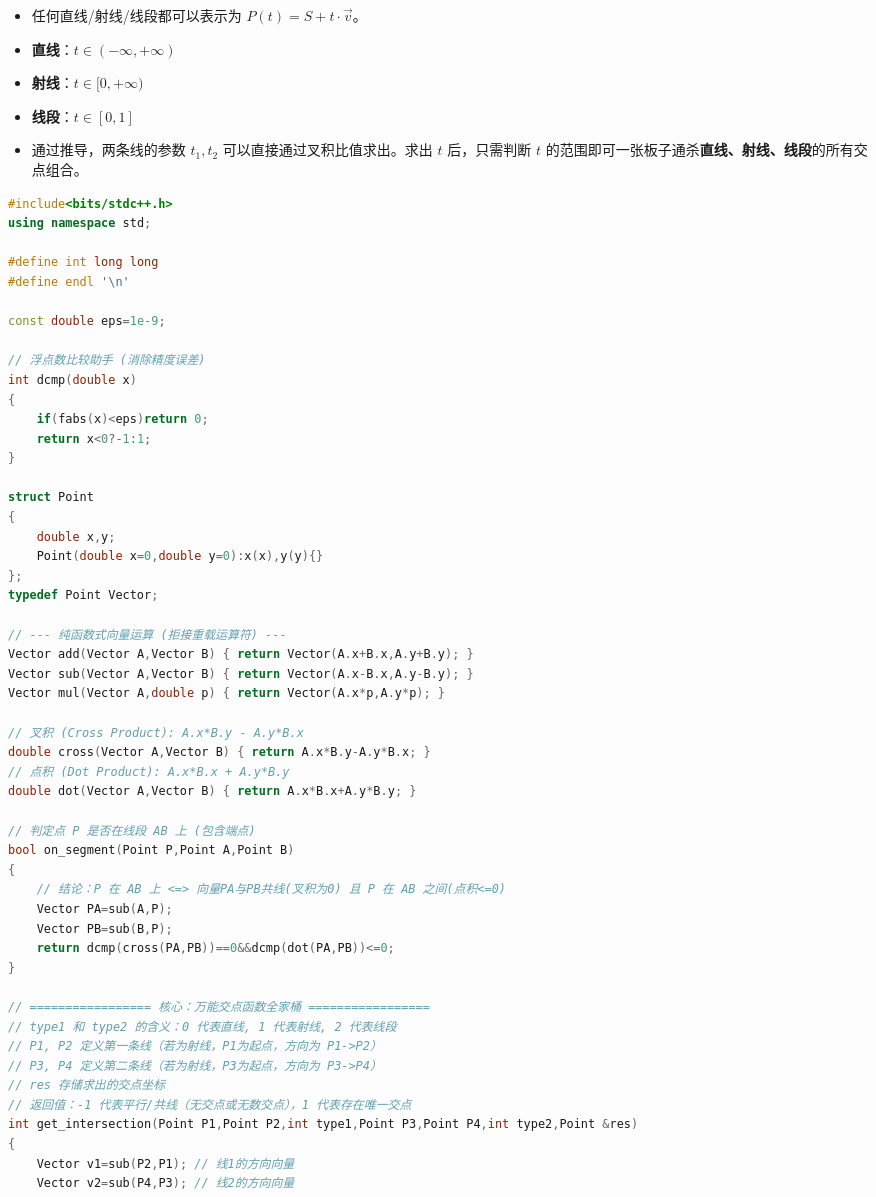 \documentclass[10pt,landscape,a4paper]{article}
\begin{document}
\begin{multicols*}{3}
\begin{enumerate}[start=1]
\begin{itemize}
\item 任何直线/射线/线段都可以表示为 $P(t) = S + t \cdot \vec{v}$。
\item \textbf{直线}：$t \in (-\infty, +\infty)$
\item \textbf{射线}：$t \in [0, +\infty)$
\item \textbf{线段}：$t \in [0, 1]$
\item 通过推导，两条线的参数 $t_1, t_2$ 可以直接通过叉积比值求出。求出 $t$ 后，只需判断 $t$ 的范围即可一张板子通杀\textbf{直线、射线、线段}的所有交点组合。
\end{itemize}
\end{enumerate}
\par{}\par
\begin{lstlisting}[language=C++]
#include<bits/stdc++.h>
using namespace std;

#define int long long
#define endl '\n'

const double eps=1e-9;

// 浮点数比较助手 (消除精度误差)
int dcmp(double x)
{
    if(fabs(x)<eps)return 0;
    return x<0?-1:1;
}

struct Point
{
    double x,y;
    Point(double x=0,double y=0):x(x),y(y){}
};
typedef Point Vector;

// --- 纯函数式向量运算 (拒接重载运算符) ---
Vector add(Vector A,Vector B) { return Vector(A.x+B.x,A.y+B.y); }
Vector sub(Vector A,Vector B) { return Vector(A.x-B.x,A.y-B.y); }
Vector mul(Vector A,double p) { return Vector(A.x*p,A.y*p); }

// 叉积 (Cross Product): A.x*B.y - A.y*B.x
double cross(Vector A,Vector B) { return A.x*B.y-A.y*B.x; }
// 点积 (Dot Product): A.x*B.x + A.y*B.y
double dot(Vector A,Vector B) { return A.x*B.x+A.y*B.y; }

// 判定点 P 是否在线段 AB 上 (包含端点)
bool on_segment(Point P,Point A,Point B)
{
    // 结论：P 在 AB 上 <=> 向量PA与PB共线(叉积为0) 且 P 在 AB 之间(点积<=0)
    Vector PA=sub(A,P);
    Vector PB=sub(B,P);
    return dcmp(cross(PA,PB))==0&&dcmp(dot(PA,PB))<=0;
}

// ================= 核心：万能交点函数全家桶 =================
// type1 和 type2 的含义：0 代表直线, 1 代表射线, 2 代表线段
// P1, P2 定义第一条线（若为射线，P1为起点，方向为 P1->P2）
// P3, P4 定义第二条线（若为射线，P3为起点，方向为 P3->P4）
// res 存储求出的交点坐标
// 返回值：-1 代表平行/共线（无交点或无数交点），1 代表存在唯一交点
int get_intersection(Point P1,Point P2,int type1,Point P3,Point P4,int type2,Point &res)
{
    Vector v1=sub(P2,P1); // 线1的方向向量
    Vector v2=sub(P4,P3); // 线2的方向向量
    

\end{lstlisting}
\end{multicols*}
\end{document}
